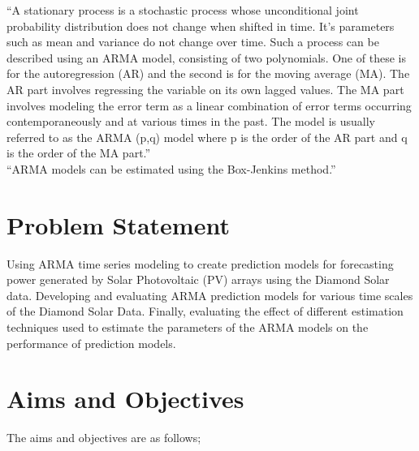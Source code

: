 \documentclass[journal]{IEEEtran}
\begin{document}
“A stationary process is a stochastic process whose unconditional joint probability distribution does not change when shifted in time. It’s parameters such as mean and variance do not change over time. Such a process can be described using an ARMA model, consisting of two polynomials. One of these is for the autoregression (AR) and the second is for the moving average (MA). The AR part involves regressing the variable on its own lagged values. The MA part involves modeling the error term as a linear combination of error terms occurring contemporaneously and at various times in the past. The model is usually referred to as the ARMA (p,q) model where p is the order of the AR part and q is the order of the MA part.”
\\
“ARMA models can be estimated using the Box-Jenkins method.” \cite{box2015time} \cite{baillie2017maximum} \cite{sandgren2012moving}
\\


\section{Problem Statement}

Using ARMA time series modeling to create prediction models for forecasting power generated by Solar Photovoltaic (PV) arrays using the Diamond Solar data. Developing and evaluating ARMA prediction models for various time scales of the Diamond Solar Data. Finally, evaluating the effect of different estimation techniques used to estimate the parameters of the ARMA models on the performance of prediction models.


\section{Aims and Objectives}

The aims and objectives are as follows;
\end{document}
